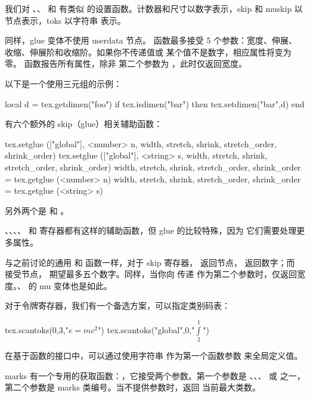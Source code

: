 我们对 、、 和  有类似
的设置函数。计数器和尺寸以数字表示，skip 和 muskip 以节点表示，toks 以字符串
表示。

同样，glue 变体不使用  userdata 节点。
函数最多接受 5 个参数：宽度、伸展、收缩、伸展阶和收缩阶。如果你不传递值或
某个值不是数字，相应属性将变为零。 函数报告所有属性，除非
第二个参数为 ，此时仅返回宽度。

以下是一个使用三元组的示例：

\begin{typing}
local d = tex.getdimen("foo")
if tex.isdimen("bar") then
    tex.setdimen("bar",d)
end
\end{typing}

有六个额外的 skip（glue）相关辅助函数：

\begin{typing}
tex.setglue (["global"], <number> n,
    width, stretch, shrink, stretch_order, shrink_order)
tex.setglue (["global"], <string> s,
    width, stretch, shrink, stretch_order, shrink_order)
width, stretch, shrink, stretch_order, shrink_order =
    tex.getglue (<number> n)
width, stretch, shrink, stretch_order, shrink_order =
    tex.getglue (<string> s)
\end{typing}

另外两个是  和 。

、、、、
和  寄存器都有这样的辅助函数，但 glue 的比较特殊，因为
它们需要处理更多属性。

与之前讨论的通用  和  函数一样，对于 skip 寄存器，
 返回节点， 返回数字；而 
接受节点， 期望最多五个数字。同样，当你向 
传递  作为第二个参数时，仅返回宽度。、
 的 mu 变体也是如此。

对于令牌寄存器，我们有一个备选方案，可以指定类别码表：

\begin{typing}
tex.scantoks(0,3,"$e=mc^2$")
tex.scantoks("global",0,"$\int\limits^1_2$")
\end{typing}

在基于函数的接口中，可以通过使用字符串  作为第一个函数参数
来全局定义值。

marks 有一个专用的获取函数：，它接受两个参数。第一个参数是
、、、 或
 之一，第二个参数是 marks 类编号。当不提供参数时，返回
当前最大类数。

